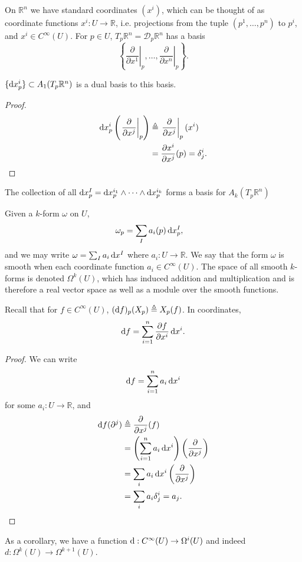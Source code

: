 On $\mathbb{R}^n$ we have standard coordinates $(x^i)$, which can be
thought of as coordinate functions $x^i: U \to \mathbb{R}$,
i.e. projections from the tuple $(p^1, \dots, p^n)$ to $p^i$, and
$x^i \in C^\infty(U)$. For $p \in U$,
$T_p \mathbb{R}^n = \mathcal{D}_p \mathbb{R}^n$ has a basis
$$
\left\{ \left.\frac{\partial}{\partial x^1}\right|_p,
         \dots,
         \left.\frac{\partial}{\partial x^n}\right|_p
\right\}.
$$
\begin{lemma}
$\{\mathop{}\!\mathrm{d} x_p^i\} \subset A_1(T_p \mathbb{R}^n)$ is a dual basis to this basis.
\end{lemma}
\begin{proof}
\begin{align*}
  \mathop{}\!\mathrm{d} x_p^i
    \left(
      \left.\frac{\partial}{\partial x^j}\right|_p
    \right)
&\triangleq
  \left.\frac{\partial}{\partial x^j}\right|_p(x^i) \\
&= \frac{\partial x^i}{\partial x^j}(p)
 = \delta_j^i.
\end{align*}
\end{proof}

\begin{corol}
The collection of all
$\mathop{}\!\mathrm{d} x_p^I = \mathop{}\!\mathrm{d} x_p^{i_1} \wedge \cdots \wedge \mathop{}\!\mathrm{d} x_p^{i_k}$
forms a basis for $A_k(T_p \mathbb{R}^n)$
\end{corol}

\begin{defn}
Given a $k$-form $\omega$ on $U$,
\begin{align*}
   \omega_p
&= \sum_I a_i(p) \mathop{}\!\mathrm{d} x_p^I,
\end{align*}
and we may write $\omega = \sum_I a_i \mathop{}\!\mathrm{d} x^I$ where
$a_i: U \to \mathbb{R}$. We say that the form $\omega$ is smooth when
each coordinate function $a_i \in C^\infty(U)$. The space of all
smooth $k$-forms is denoted $\Omega^k(U)$, which has induced addition
and multiplication and is therefore a real vector space as well as a
module over the smooth functions.
\end{defn}

\begin{prop}
Recall that for $f \in C^\infty(U)$,
$(\mathop{}\!\mathrm{d} f)_p (X_p) \triangleq X_p(f)$. In coordinates,
$$
  \mathop{}\!\mathrm{d} f
= \sum_{i=1}^n \frac{\partial f}{\partial x^i} \mathop{}\!\mathrm{d} x^i.
$$
\end{prop}
\begin{proof}
We can write
$$
  \mathop{}\!\mathrm{d} f
= \sum_{i=1}^n a_i \mathop{}\!\mathrm{d} x^i
$$
for some $a_i : U \to \mathbb{R}$, and
\begin{align*}
   \mathop{}\!\mathrm{d} f (\partial^j)
&\triangleq
   \frac{\partial}{\partial x^j}(f) \\
&= \left(
     \sum_{i=1}^n a_i \mathop{}\!\mathrm{d} x^i
   \right)
   \left(
     \frac{\partial}{\partial x^j}
   \right) \\
&= \sum_i
     a_i \mathop{}\!\mathrm{d} x^i
     \left(
       \frac{\partial}{\partial x^j}
     \right) \\
&= \sum_i a_i \delta_j^i = a_j.
\end{align*}
\end{proof}
As a corollary, we have a function
$\mathop{}\!\mathrm{d} : C^\infty(U) \to \Omega^i(U)$ and indeed
$d: \Omega^k(U) \to \Omega^{k+1}(U)$.
